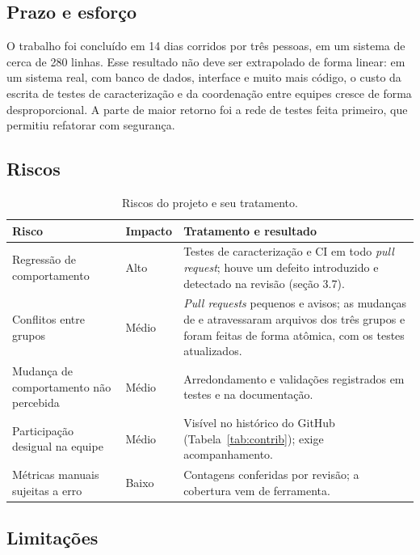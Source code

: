 \documentclass[12pt,a4paper]{article}
\newcommand{\code}[1]{\texttt{\detokenize{#1}}}
\begin{document}
\subsection{Prazo e esforço}

O trabalho foi concluído em 14 dias corridos por três pessoas, em um sistema de cerca de 280 linhas. Esse resultado não deve ser extrapolado de forma linear: em um sistema real, com banco de dados, interface e muito mais código, o custo da escrita de testes de caracterização e da coordenação entre equipes cresce de forma desproporcional. A parte de maior retorno foi a rede de testes feita primeiro, que permitiu refatorar com segurança.

\subsection{Riscos}

\begin{table}[H]\centering\small\singlespacing
\begin{tabularx}{\textwidth}{>{\raggedright\arraybackslash}p{4.4cm}>{\raggedright\arraybackslash}p{2cm}Y}
\toprule \textbf{Risco} & \textbf{Impacto} & \textbf{Tratamento e resultado} \\ \midrule
Regressão de comportamento & Alto & Testes de caracterização e CI em todo \textit{pull request}; houve um defeito introduzido e detectado na revisão (seção 3.7). \\
Conflitos entre grupos & Médio & \textit{Pull requests} pequenos e avisos; as mudanças de \code{Money} e \code{Quantity} atravessaram arquivos dos três grupos e foram feitas de forma atômica, com os testes atualizados. \\
Mudança de comportamento não percebida & Médio & Arredondamento e validações registrados em testes e na documentação. \\
Participação desigual na equipe & Médio & Visível no histórico do GitHub (Tabela~\ref{tab:contrib}); exige acompanhamento. \\
Métricas manuais sujeitas a erro & Baixo & Contagens conferidas por revisão; a cobertura vem de ferramenta. \\
\bottomrule\end{tabularx}
\caption{Riscos do projeto e seu tratamento.}\end{table}

\subsection{Limitações}
\end{document}
